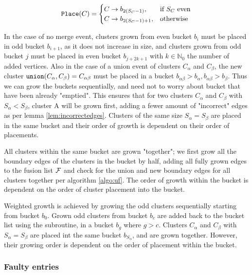 \begin{equation}\label{eq:bucket_place}
  \texttt{Place}(C) = \begin{cases}
               C\rightarrow b_{2(S_C-1)}, & \mbox{if $S_C$ even} \\
               C\rightarrow b_{2(S_C-1)+1}, & \mbox{otherwise}
             \end{cases}
\end{equation}

In the case of no merge event, clusters grown from even bucket $b_i$ must be placed in odd bucket $b_{i + 1}$, as it does not increase in size, and clusters grown from odd bucket $j$ must be placed in even bucket $b_{j + 2k + 1}$ with $k \in \mathbb{N}_0$ the number of added vertices. Also in the case of a union event of clusters $C_\alpha$ and $C_\beta$, the new cluster $\texttt{union}(C_\alpha, C_\beta) = C_{\alpha\beta}$ must be placed in a bucket $b_{\alpha\beta} > b_{\alpha}, b_{\alpha\beta} > b_{\beta}$. Thus we can grow the buckets sequentially, and need not to worry about bucket that have been already "emptied". This ensures that for two clusters $C_\alpha$ and $C_\beta$ with $S_\alpha < S_\beta$, cluster A will be grown first, adding a fewer amount of "incorrect" edges as per lemma \ref{lem:incorrectedges}. Clusters of the same size $S_\alpha=S_\beta$ are placed in the same bucket and their order of growth is dependent on their order of placements.

All clusters within the same bucket are grown "together"; we first grow all the boundary edges of the clusters in the bucket by half, adding all fully grown edges to the fusion list $\mathcal{F}$ and check for the union and new boundary edges for all clusters together per algorithm \ref{algo:uf}. The order of growth within the bucket is dependent on the order of cluster placement into the bucket.

\begin{theorem}\label{the:bucket_order}
  Weighted growth is achieved by growing the odd clusters sequentially starting from bucket $b_0$. Grown odd clusters from bucket $b_c$ are added back to the bucket list using the  subroutine, in a bucket $b_{g}$ where $g > c$. Clusters $C_\alpha$ and $C_\beta$ with $S_\alpha = S_\beta$ are placed int the same bucket $b_{S_\alpha}$, and are grown together. However, their growing order is dependent on the order of placement within the bucket.
\end{theorem}

\subsubsection{Faulty entries}

